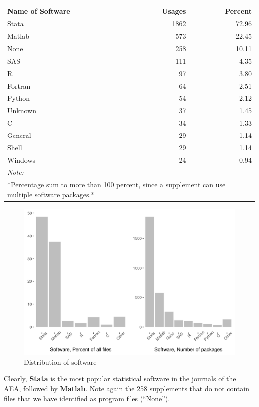 \documentclass[]{article}
\begin{document}
\begin{table}[H]
\centering
\begin{tabular}{l|r|r}
\hline
Name of Software & Usages & Percent\\
\hline
Stata & 1862 & 72.96\\
\hline
Matlab & 573 & 22.45\\
\hline
None & 258 & 10.11\\
\hline
SAS & 111 & 4.35\\
\hline
R & 97 & 3.80\\
\hline
Fortran & 64 & 2.51\\
\hline
Python & 54 & 2.12\\
\hline
Unknown & 37 & 1.45\\
\hline
C & 34 & 1.33\\
\hline
General & 29 & 1.14\\
\hline
Shell & 29 & 1.14\\
\hline
Windows & 24 & 0.94\\
\hline
\multicolumn{3}{l}{\textit{Note: }}\\
\multicolumn{3}{l}{*Percentage sum to more than 100 percent, since a supplement can use multiple software packages.*}\\
\end{tabular}
\end{table}

\begin{figure}
\centering
\includegraphics{figure_software.png}
\caption{Distribution of software}
\end{figure}

Clearly, \textbf{Stata} is the most popular statistical software in the
journals of the AEA, followed by \textbf{Matlab}. Note again the 258
supplements that do not contain files that we have identified as program
files (``None'').
\end{document}
